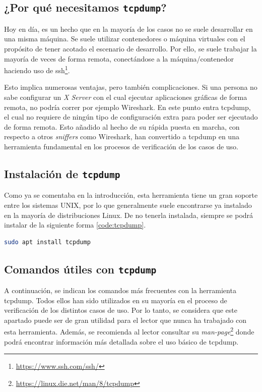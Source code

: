 \subsection{¿Por qué necesitamos \texttt{tcpdump}?}

Hoy en día, es un hecho que en la mayoría de los casos no se suele desarrollar en una misma máquina. Se suele utilizar contenedores o máquina virtuales con el propósito de tener acotado el escenario de desarrollo. Por ello, se suele trabajar la mayoría de veces de forma remota, conectándose a la máquina/contenedor haciendo uso de ssh\footnote{\url{https://www.ssh.com/ssh/}}.\\
\par

Esto implica numerosas ventajas, pero también complicaciones. Si una persona no sabe configurar un \textit{X Server} con el cual ejecutar aplicaciones gráficas de forma remota, no podría correr por ejemplo Wireshark. En este punto entra tcpdump, el cual no requiere de ningún tipo de configuración extra para poder ser ejecutado de forma remota. Esto añadido al hecho de su rápida puesta en marcha, con respecto a otros \textit{sniffers} como Wireshark, han convertido a tcpdump en una herramienta fundamental en los procesos de verificación de los casos de uso. 

\subsection{Instalación de \texttt{tcpdump}}

Como ya se comentaba en la introducción, esta herramienta tiene un gran soporte entre los sistemas UNIX, por lo que generalmente suele encontrarse ya instalado en la mayoría de distribuciones Linux. De no tenerla instalada, siempre se podrá instalar de la siguiente forma \ref{code:tcpdump}.

\begin{lstlisting}[language= bash, style=Consola2, caption={Instalación de Tcpdump},label=code:tcpdump]
    sudo apt install tcpdump
\end{lstlisting}

\subsection{Comandos útiles con \texttt{tcpdump}}

A continuación, se indican los comandos más frecuentes con la herramienta tcpdump. Todos ellos han sido utilizados en su mayoría en el proceso de verificación de los distintos casos de uso. Por lo tanto, se considera que este apartado puede ser de gran utilidad para el lector que nunca ha trabajado con esta herramienta. Además, se recomienda al lector consultar su \textit{man-page}\footnote{\url{https://linux.die.net/man/8/tcpdump}} donde podrá encontrar información más detallada sobre el uso básico de tcpdump.

